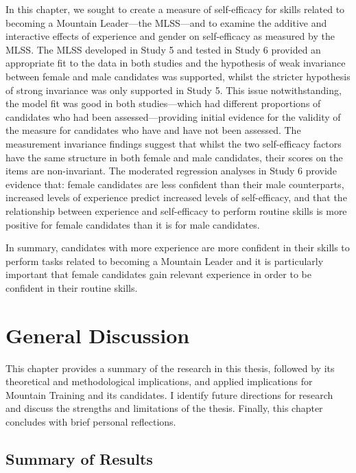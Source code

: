 \documentclass[
  12pt,
  a4paper,
]{book}
\begin{document}
In this chapter, we sought to create a measure of self-efficacy for skills related to becoming a Mountain Leader---the MLSS---and to examine the additive and interactive effects of experience and gender on self-efficacy as measured by the MLSS. The MLSS developed in Study 5 and tested in Study 6 provided an appropriate fit to the data in both studies and the hypothesis of weak invariance between female and male candidates was supported, whilst the stricter hypothesis of strong invariance was only supported in Study 5. This issue notwithstanding, the model fit was good in both studies---which had different proportions of candidates who had been assessed---providing initial evidence for the validity of the measure for candidates who have and have not been assessed. The measurement invariance findings suggest that whilst the two self-efficacy factors have the same structure in both female and male candidates, their scores on the items are non-invariant. The moderated regression analyses in Study 6 provide evidence that: female candidates are less confident than their male counterparts, increased levels of experience predict increased levels of self-efficacy, and that the relationship between experience and self-efficacy to perform routine skills is more positive for female candidates than it is for male candidates.

In summary, candidates with more experience are more confident in their skills to perform tasks related to becoming a Mountain Leader and it is particularly important that female candidates gain relevant experience in order to be confident in their routine skills.

\hypertarget{general-discussion}{%
\chapter{General Discussion}\label{general-discussion}}

This chapter provides a summary of the research in this thesis, followed by its theoretical and methodological implications, and applied implications for Mountain Training and its candidates. I identify future directions for research and discuss the strengths and limitations of the thesis. Finally, this chapter concludes with brief personal reflections.

\hypertarget{general-discussion-summary-of-results}{%
\section{Summary of Results}\label{general-discussion-summary-of-results}}
\end{document}
